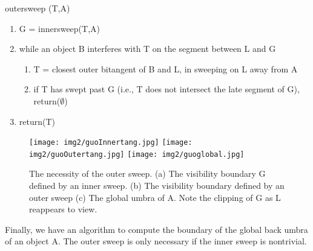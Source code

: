 \documentclass[9pt,twocolumn]{article}
\newif\ifJournal
\begin{document}
\vspace{.2in}

\centerline{outersweep (T,A)}

\begin{enumerate}
\item G = innersweep(T,A)
\item while an object B interferes with T on the segment between L and G
\begin{enumerate}
\item T = closest outer bitangent of B and L, in sweeping on L away from A
\item if T has swept past G (i.e., T does not intersect the late segment of G), 
      return($\emptyset$)
\end{enumerate}
\item return(T)
\end{enumerate}

\begin{figure}
\begin{center}
\texttt{[image: img2/guoInnertang.jpg]}
\texttt{[image: img2/guoOutertang.jpg]}
\texttt{[image: img2/guoglobal.jpg]}
\end{center}
\caption{The necessity of the outer sweep.
        (a) The visibility boundary G defined by an inner sweep. 
        (b) The visibility boundary defined by an outer sweep
        (c) The global umbra of A.
            Note the clipping of G as L reappears to view.}
\label{fig:needoutersweep}
\end{figure}

\ifJournal
The output of the outer sweep algorithm outersweep(T,A)
is a new boundary of the global umbra,
which starts after its intersection with innersweep(T,A).
See Figures~\ref{fig:needoutersweep}c and \ref{fig:globalcornelllip}c.
\fi


Finally, we have an algorithm to compute the boundary of the 
global back umbra of an object A.
The outer sweep is only necessary if the inner sweep is nontrivial.
\end{document}
